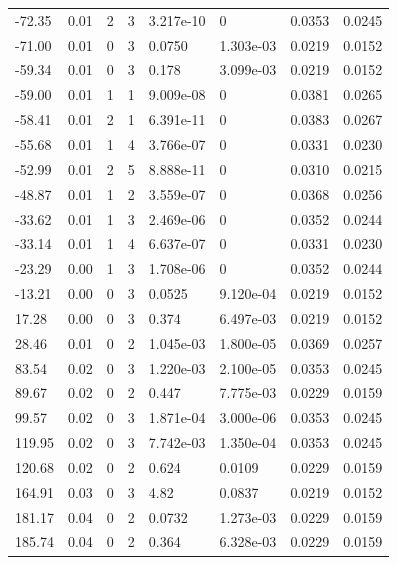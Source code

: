 \documentclass[preview]{standalone}
\begin{document}
{{\begin{tabular}{L{1.2cm}C{1.2cm} C{0.3cm}C{0.5cm} C{1.4cm}C{1.4cm} C{1.4cm}C{1.4cm}}
  -72.35  &  0.01  & 2     &  3 &  3.217e-10  & 0  & 0.0353 &  0.0245   \\ 
  -71.00  &  0.01  & 0     &  3 &  0.0750  & 1.303e-03  & 0.0219 &  0.0152   \\ 
  -59.34  &  0.01  & 0     &  3 &  0.178  & 3.099e-03  & 0.0219 &  0.0152   \\ 
  -59.00  &  0.01  & 1     &  1 &  9.009e-08  & 0  & 0.0381 &  0.0265   \\ 
  -58.41  &  0.01  & 2     &  1 &  6.391e-11  & 0  & 0.0383 &  0.0267   \\ 
  -55.68  &  0.01  & 1     &  4 &  3.766e-07  & 0  & 0.0331 &  0.0230   \\ 
  -52.99  &  0.01  & 2     &  5 &  8.888e-11  & 0  & 0.0310 &  0.0215   \\ 
  -48.87  &  0.01  & 1     &  2 &  3.559e-07  & 0  & 0.0368 &  0.0256   \\ 
  -33.62  &  0.01  & 1     &  3 &  2.469e-06  & 0  & 0.0352 &  0.0244   \\ 
  -33.14  &  0.01  & 1     &  4 &  6.637e-07  & 0  & 0.0331 &  0.0230   \\ 
  -23.29  &  0.00  & 1     &  3 &  1.708e-06  & 0  & 0.0352 &  0.0244   \\ 
  -13.21  &  0.00  & 0     &  3 &  0.0525  & 9.120e-04  & 0.0219 &  0.0152   \\ 
  17.28  &  0.00  & 0     &  3 &  0.374  & 6.497e-03  & 0.0219 &  0.0152   \\ 
  28.46  &  0.01  & 0     &  2 &  1.045e-03  & 1.800e-05  & 0.0369 &  0.0257   \\ 
  83.54  &  0.02  & 0     &  3 &  1.220e-03  & 2.100e-05  & 0.0353 &  0.0245   \\ 
  89.67  &  0.02  & 0     &  2 &  0.447  & 7.775e-03  & 0.0229 &  0.0159   \\ 
  99.57  &  0.02  & 0     &  3 &  1.871e-04  & 3.000e-06  & 0.0353 &  0.0245   \\ 
  119.95  &  0.02  & 0     &  3 &  7.742e-03  & 1.350e-04  & 0.0353 &  0.0245   \\ 
  120.68  &  0.02  & 0     &  2 &  0.624  & 0.0109  & 0.0229 &  0.0159   \\ 
  164.91  &  0.03  & 0     &  3 &  4.82  & 0.0837  & 0.0219 &  0.0152   \\ 
  181.17  &  0.04  & 0     &  2 &  0.0732  & 1.273e-03  & 0.0229 &  0.0159   \\ 
  185.74  &  0.04  & 0     &  2 &  0.364  & 6.328e-03  & 0.0229 &  0.0159   \\ 

\end{tabular}}}
\end{document}
